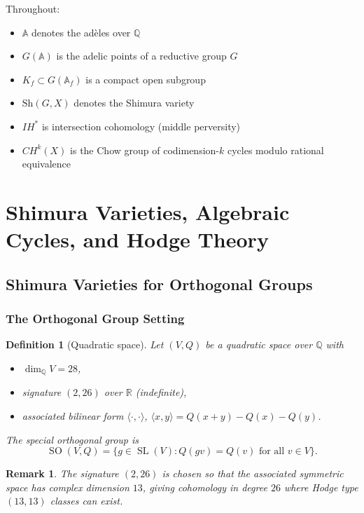 \documentclass[12pt]{amsart}
\newtheorem{definition}[theorem]{Definition}
\newtheorem{remark}[theorem]{Remark}
\theoremstyle{definition}
\DeclareMathOperator\SO{SO}
\DeclareMathOperator\SL{SL}
\newcommand{\A}{\mathbb{A}}
\newcommand{\Q}{\mathbb{Q}}
\newcommand{\R}{\mathbb{R}}
\newcommand{\IH}{\mathit{IH}}
\newcommand{\CH}{\mathit{CH}}
\begin{document}
Throughout:
\begin{itemize}[nosep]
\item $\A$ denotes the adèles over $\Q$
\item $G(\A)$ is the adelic points of a reductive group $G$
\item $K_f \subset G(\A_f)$ is a compact open subgroup
\item $\mathrm{Sh}(G, X)$ denotes the Shimura variety
\item $\IH^*$ is intersection cohomology (middle perversity)
\item $\CH^k(X)$ is the Chow group of codimension-$k$ cycles modulo rational equivalence
\end{itemize}

\section{Shimura Varieties, Algebraic Cycles, and Hodge Theory}
\label{sec:shimura}

\subsection{Shimura Varieties for Orthogonal Groups}

\subsubsection{The Orthogonal Group Setting}

\begin{definition}[Quadratic space]
Let $(V, Q)$ be a quadratic space over $\Q$ with
\begin{itemize}[nosep]
\item $\dim_{\Q} V = 28$,
\item signature $(2, 26)$ over $\R$ (indefinite),
\item associated bilinear form $\langle \cdot, \cdot \rangle$, $\langle x, y \rangle = Q(x+y) - Q(x) - Q(y)$.
\end{itemize}
The special orthogonal group is
\[
\SO(V, Q) = \{ g \in \SL(V) : Q(gv) = Q(v) \text{ for all } v \in V \}.
\]
\end{definition}

\begin{remark}
The signature $(2, 26)$ is chosen so that the associated symmetric space has complex dimension $13$, giving cohomology in degree $26$ where Hodge type $(13, 13)$ classes can exist.
\end{remark}
\end{document}
